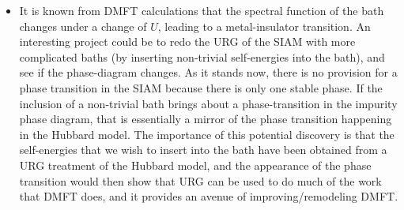 \documentclass[twoside]{report}
\numberwithin{equation}{section}
\begin{document}
\begin{itemize}
	\item It is known from DMFT calculations that the spectral function of the bath changes under a change of \(U\), leading to a metal-insulator transition. An interesting project could be to redo the URG of the SIAM with more complicated baths (by inserting non-trivial self-energies into the bath), and see if the phase-diagram changes. As it stands now, there is no provision for a phase transition in the SIAM because there is only one stable phase. If the inclusion of a non-trivial bath brings about a phase-transition in the impurity phase diagram, that is essentially a mirror of the phase transition happening in the Hubbard model. The importance of this potential discovery is that the self-energies that we wish to insert into the bath have been obtained from a URG treatment of the Hubbard model, and the appearance of the phase transition would then show that URG can be used to do much of the work that DMFT does, and it provides an avenue of improving/remodeling DMFT.
\end{itemize}


\end{document}
